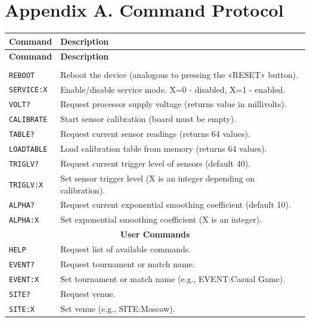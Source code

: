 \documentclass[a4paper,12pt]{article}
\begin{document}
\clearpage
\section*{Appendix A. Command Protocol}
\label{sec:protocol}

\begin{longtable}{|p{}|p{}|}
\hline
\textbf{Command} & \textbf{Description} \\ \hline
\endfirsthead
\hline
\textbf{Command} & \textbf{Description} \\ \hline
\endhead
\hline
\endfoot
\multicolumn{2}{|c|}{\textbf{Service Commands}} \\ \hline
\texttt{REBOOT} & Reboot the device (analogous to pressing the «RESET» button). \\ \hline
\texttt{SERVICE:X} & Enable/disable service mode. X=0 - disabled, X=1 - enabled. \\ \hline
\texttt{VOLT?} & Request processor supply voltage (returns value in millivolts). \\ \hline
\texttt{CALIBRATE} & Start sensor calibration (board must be empty). \\ \hline
\texttt{TABLE?} & Request current sensor readings (returns 64 values). \\ \hline
\texttt{LOADTABLE} & Load calibration table from memory (returns 64 values). \\ \hline
\texttt{TRIGLV?} & Request current trigger level of sensors (default 40). \\ \hline
\texttt{TRIGLV:X} & Set sensor trigger level (X is an integer depending on calibration). \\ \hline
\texttt{ALPHA?} & Request current exponential smoothing coefficient (default 10). \\ \hline
\texttt{ALPHA:X} & Set exponential smoothing coefficient (X is an integer). \\ \hline
\multicolumn{2}{|c|}{\textbf{User Commands}} \\ \hline
\texttt{HELP} & Request list of available commands. \\ \hline
\texttt{EVENT?} & Request tournament or match name. \\ \hline
\texttt{EVENT:X} & Set tournament or match name (e.g., EVENT:Casual Game). \\ \hline
\texttt{SITE?} & Request venue. \\ \hline
\texttt{SITE:X} & Set venue (e.g., SITE:Moscow). \\ \hline

\end{longtable}
\end{document}
